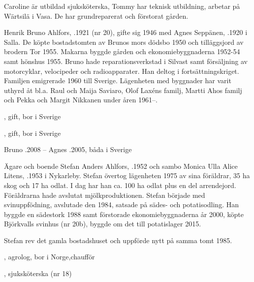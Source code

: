 Caroline är utbildad sjuksköterska, Tommy har teknisk utbildning, arbetar på Wärtsilä i Vasa. De har grundreparerat och förstorat gården.
\begin{jhchildren}
  \item {}
  \item {}
\end{jhchildren}


Henrik Bruno Ahlfors, .1921 (nr 20), gifte sig 1946 med Agnes Seppänen, .1920 i Salla.  De köpte bostadstomten av Brunos mors dödsbo 1950 och tilläggsjord av brodern Tor 1955. Makarna byggde gården och ekonomiebyggnaderna 1952-54 samt hönshus 1955. Bruno hade reparationsverkstad i Silvast samt försäljning av motorcyklar, velocipeder och radioapparater.  Han deltog i fortsättningskriget. Familjen emigrerade 1960 till Sverige.  Lägenheten med byggnader har varit uthyrd  åt bl.a. Raul och Maija Saviaro, Olof Laxéns familj, Martti Ahos familj och Pekka och Margit Nikkanen under åren 1961--.
\begin{jhchildren}
  \item {}, gift, bor i Sverige
  \item {}, gift, bor i Sverige
\end{jhchildren}
Bruno .2008  --  Agnes .2005, båda i Sverige




Ägare och boende Stefan Anders Ahlfors, .1952 och sambo Monica Ulla Alice Litens, .1953 i Nykarleby. Stefan övertog lägenheten 1975 av sina föräldrar, 35 ha skog och 17 ha odlat. I dag har han ca. 100 ha odlat plus en del arrendejord.  Föräldrarna hade avslutat mjölkproduktionen. Stefan började med svinuppfödning, avslutade den 1984, satsade på sädes- och potatisodling. Han byggde en sädestork 1988 samt förstorade ekonomiebyggnaderna  år 2000, köpte Björkvalls svinhus (nr 20b), byggde om det till potatislager 2015.


Stefan rev det gamla bostadshuset och uppförde nytt på samma tomt 1985.
\begin{jhchildren}
  \item {}, agrolog, bor i Norge,chaufför
  \item {}, sjuksköterska (nr 18)
\end{jhchildren}


